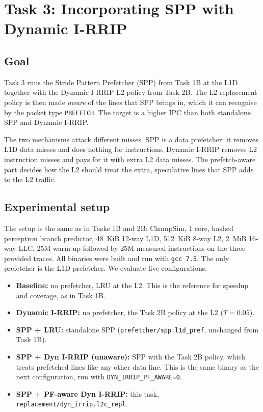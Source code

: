 \documentclass[11pt]{article}
\begin{document}
\setcounter{section}{2}

\section{Task 3: Incorporating SPP with Dynamic I-RRIP}

\subsection{Goal}

Task 3 runs the Stride Pattern Prefetcher (SPP) from Task 1B at the L1D together with the
Dynamic I-RRIP L2 policy from Task 2B. The L2 replacement policy is then made \emph{aware} of
the lines that SPP brings in, which it can recognise by the packet type \texttt{PREFETCH}. The
target is a higher IPC than both standalone SPP and Dynamic I-RRIP.

The two mechanisms attack different misses. SPP is a data prefetcher: it removes L1D data misses
and does nothing for instructions. Dynamic I-RRIP removes L2 instruction misses and pays for it
with extra L2 data misses. The prefetch-aware part decides how the L2 should treat the extra,
speculative lines that SPP adds to the L2 traffic.

\subsection{Experimental setup}

The setup is the same as in Tasks 1B and 2B: ChampSim, 1 core, hashed perceptron branch
predictor, 48~KiB 12-way L1D, 512~KiB 8-way L2, 2~MiB 16-way LLC, 25M warm-up followed by 25M
measured instructions on the three provided traces. All binaries were built and run with
\texttt{gcc 7.5}. The only prefetcher is the L1D prefetcher. We evaluate five configurations:

\begin{itemize}
  \item \textbf{Baseline:} no prefetcher, LRU at the L2. This is the reference for speedup and
        coverage, as in Task 1B.
  \item \textbf{Dynamic I-RRIP:} no prefetcher, the Task 2B policy at the L2 ($T=0.05$).
  \item \textbf{SPP + LRU:} standalone SPP (\texttt{prefetcher/spp.l1d\_pref}, unchanged from
        Task 1B).
  \item \textbf{SPP + Dyn I-RRIP (unaware):} SPP with the Task 2B policy, which treats prefetched
        lines like any other data line. This is the same binary as the next configuration, run
        with \texttt{DYN\_IRRIP\_PF\_AWARE=0}.
  \item \textbf{SPP + PF-aware Dyn I-RRIP:} this task, \texttt{replacement/dyn\_irrip.l2c\_repl}.
\end{itemize}
\end{document}
